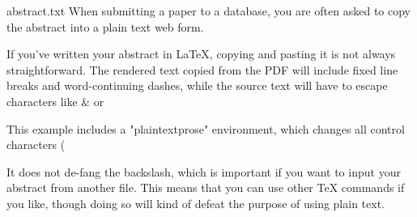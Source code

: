 \begin{filecontents*}{abstract.txt}
When submitting a paper to a database, you are often asked to copy the abstract into a plain text web form.

If you've written your abstract in LaTeX, copying and pasting it is not always straightforward. The rendered text copied from the PDF will include fixed line breaks and word-continuing dashes, while the source text will have to escape characters like & or %

This example includes a "plaintextprose" environment, which changes all control characters (%

It does not de-fang the backslash, which is important if you want to input your abstract from another file. This means that you can use other \TeX{} commands if you like, though doing so will kind of defeat the purpose of using plain text.
\end{filecontents*}

\documentclass{article}
\thispagestyle{empty}   %

\usepackage[strict=true]{csquotes}

%
%
%
\newenvironment{plaintextprose}
{%
    \begingroup%
        \catcode`\$=12%
        \catcode`\&=12%
        \catcode`\#=12%
        \catcode`\^=12%
        \catcode`\_=12%
        \catcode`\~=12%
        \catcode`\%=12}
{\endgroup}



    \begin{abstract}%
        \begin{plaintextprose}\end{plaintextprose}%
    \end{abstract}



